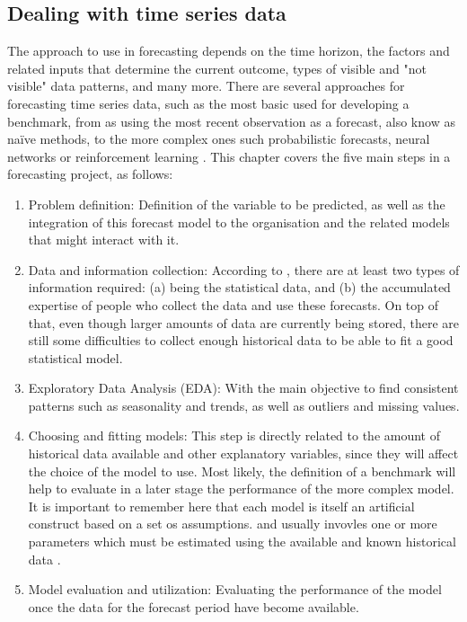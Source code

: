 \subsection{Dealing with time series data}
The approach to use in forecasting depends on the time horizon, the factors and related inputs that determine the current outcome, types of visible and "not visible" data patterns, and many more. There are several approaches for forecasting time series data, such as the most basic used for developing a benchmark, from as using the most recent observation as a forecast, also know as na\"{i}ve methods, to the more complex ones such probabilistic forecasts, neural networks or reinforcement learning \cite{Hyndman2021}. This chapter covers the five main steps in a forecasting project, as follows: 
\begin{enumerate}
\item Problem definition: Definition of the variable to be predicted, as well as the integration of this forecast model to the organisation and the related models that might interact with it. 
\item Data and information collection: According to \cite{Hyndman2021}, there are at least two types of information required: (a) being the statistical data, and (b) the accumulated expertise of people who collect the data and use these forecasts. On top of that, even though larger amounts of data are currently being stored, there are still some difficulties to collect enough historical data to be able to fit a good statistical model. 
\item Exploratory Data Analysis (EDA): With the main objective to find consistent patterns such as seasonality and trends, as well as outliers and missing values. 
\item Choosing and fitting models: This step is directly related to the amount of historical data available and other explanatory variables, since they will affect the choice of the model to use. Most likely, the definition of a benchmark will help to evaluate in a later stage the performance of the more complex model. It is important to remember here that each model is itself an artificial construct based on a set os assumptions. and usually invovles one or more parameters which must be estimated using the available and known historical data  \cite{Hyndman2021}. 
\item Model evaluation and utilization: Evaluating the performance of the model once the data for the forecast period have become available.
\end{enumerate}

